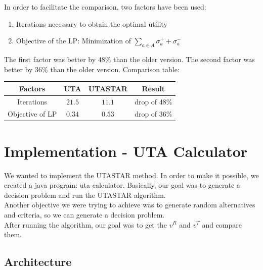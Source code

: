 \documentclass{report}
\begin{document}
In order to facilitate the comparison, two factors have been used:
\begin{enumerate}
\item Iterations necessary to obtain the optimal utility
\item Objective of the LP: Minimization of $ \sum_{a \in A} \sigma _{a}^{+} + \sigma _{a}^{-} $ 
\end{enumerate}

The first factor was better by $48\%$ than the older version. The second factor was better by $36\%$ than the older version. 
Comparison table:

\begin{center}
\begin{tabular}{| c | c | c | c |} 
\hline
Factors & UTA & UTASTAR & Result \\
\hline
Iterations & $21.5$ & $11.1$ & drop of 48\% \\ 
\hline
Objective of LP & $0.34$ & $0.53$ & drop of 36\%\\ 
\hline
\end{tabular}
\end{center}

\newpage
\section{Implementation - UTA Calculator}
We wanted to implement the UTASTAR method. In order to make it possible, we created a java program: uta-calculator. Basically, our goal was to generate a decision problem and run the UTASTAR algorithm. \\
Another objective we were trying to achieve was to generate random alternatives and criteria, so we can generate a decision problem. \\
After running the algorithm, our goal was to get the $v^{R}$ and $v^{T}$ and compare them. 
\subsection{Architecture}
\end{document}
